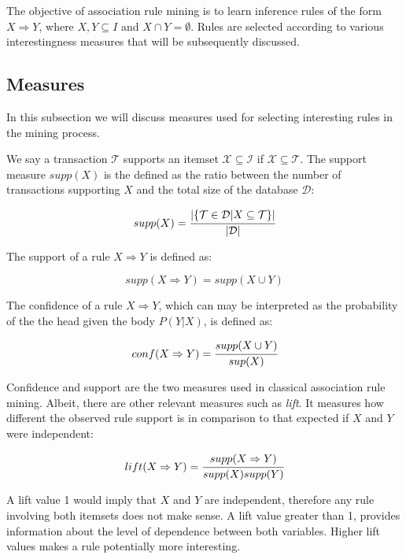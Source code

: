 The objective of association rule mining is to learn inference rules of the form $X \Rightarrow Y$, where $X,Y
\subseteq I$ and $X \cap Y = \emptyset$. Rules are selected according to various interestingness measures that will be
subsequently discussed.

\subsection{Measures}

In this subsection we will discuss measures used for selecting interesting rules in the mining process.

We say a transaction $\mathcal{T}$ supports an itemset $\mathcal{X} \subseteq \mathcal{I}$ if $\mathcal{X} \subseteq
\mathcal{T}$. The support measure $supp(X)$ is the defined as the ratio between the number of transactions supporting
$X$ and the total size of the database $\mathcal{D}$:

\begin{equation}
 supp(X)=\cfrac{|\{ \mathcal{T} \in \mathcal{D} | X \subseteq \mathcal{T} \}|}{|\mathcal{D}|}
\end{equation}

The support of a rule $X \Rightarrow Y$ is defined as:

\begin{equation}
 supp(X \Rightarrow Y)=supp(X \cup Y)
\end{equation}

The confidence of a rule $X \Rightarrow Y$, which can may be interpreted as the probability of the the head given the
body $P(Y|X)$, is defined as:

\begin{equation}
 conf(X \Rightarrow Y)=\cfrac{supp(X \cup Y)}{sup(X)}
\end{equation}

Confidence and support are the two measures used in classical association rule mining. Albeit, there are other
relevant
measures such as \emph{lift}. It measures how different the observed rule support is in comparison to that expected if
$X$ and $Y$ were independent:

\begin{equation}
 lift(X \Rightarrow Y)=\cfrac{supp(X \Rightarrow Y)}{supp(X)supp(Y)}
\end{equation}

A lift value 1 would imply that $X$ and $Y$ are independent, therefore any rule involving both itemsets does not make
sense. A lift value greater than 1, provides information about the level of dependence between both variables. Higher
lift values makes a rule potentially more interesting.

